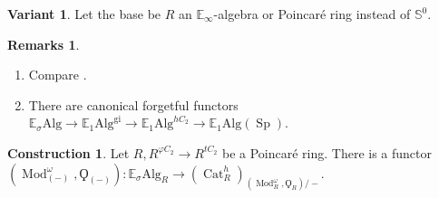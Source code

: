 \documentclass{article}
\DeclareMathOperator{\Cat}{Cat} %
\DeclareMathOperator{\Mod}{Mod} %
\DeclareMathOperator{\BiMod}{BiMod} %
\DeclareMathOperator{\Spectra}{Sp} %
\theoremstyle{definition}
\newtheorem{definition}[equation]{Definition}
\newtheorem{construction}[equation]{Construction}
\newtheorem{remarks}[equation]{Remarks}
\newtheorem{variant}[equation]{Variant}
\begin{document}
\begin{variant}
   Let the base be $ R $ an $ \mathbb{E}_\infty $-algebra or Poincaré ring instead of $ \mathbb{S}^0 $. 
\end{variant}
\begin{remarks}
\begin{enumerate}
   \item Compare \cite[Corollary 3.10]{AKGH_real_THH}. 
   \item There are canonical forgetful functors $  \mathbb{E}_\sigma\mathrm{Alg} \to \mathbb{E}_1\mathrm{Alg}^{\mathrm{gi}} \to \mathbb{E}_1\mathrm{Alg}^{hC_2} \to \mathbb{E}_1\mathrm{Alg}(\Spectra) $. 
\end{enumerate}
\end{remarks}
\begin{construction}\label{cons:Esigma_alg_to_R_lin_hermitian_cat}
   Let $ R, R^{\varphi C_2} \to R^{tC_2} $ be a Poincaré ring. 
   There is a functor $ \left(\Mod_{(-)}^\omega, \Qoppa_{(-)}\right) \colon \mathbb{E}_\sigma\mathrm{Alg}_R \to \left(\Cat^h_R\right)_{\left(\Mod_R^\omega,\Qoppa_R\right)/-} $. 
\end{construction}
\end{document}
